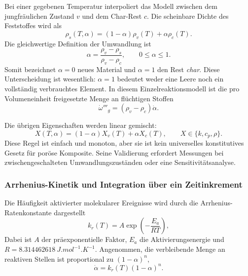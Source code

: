 \documentclass[oneside,openany]{amsdtx}
\begin{document}
Bei einer gegebenen Temperatur interpoliert das Modell zwischen dem jungfräulichen Zustand \(v\) und dem Char-Rest \(c\). Die scheinbare Dichte des Feststoffes wird als
\begin{equation}
  \rho_s(T,\alpha)=(1-\alpha)\rho_v(T)+\alpha\rho_c(T).
  \label{eq:density-mix}
\end{equation}
Die gleichwertige Definition der Umwandlung ist
\begin{equation}
  \alpha=\frac{\rho_v-\rho_s}{\rho_v-\rho_c},\qquad 0\le\alpha\le1.
  \label{eq:alpha-density}
\end{equation}
Somit bezeichnet \(\alpha=0\) neues Material und \(\alpha=1\) den Rest \emph{char}. Diese Unterscheidung ist wesentlich: \(\alpha=1\) bedeutet weder eine Leere noch ein vollständig verbrauchtes Element. In diesem Einzelreaktionsmodell ist die pro Volumeneinheit freigesetzte Menge an flüchtigen Stoffen
\begin{equation}
  \dot\omega'''_g=(\rho_v-\rho_c)\dot\alpha.
  \label{eq:gas-source}
\end{equation}

Die übrigen Eigenschaften werden linear gemischt:
\begin{equation}
  X(T,\alpha)=(1-\alpha)X_v(T)+\alpha X_c(T),
  \qquad X\in\{k,c_p,\rho\}.
  \label{eq:mix-rule}
\end{equation}
Diese Regel ist einfach und monoton, aber sie ist kein universelles konstitutives Gesetz für poröse Komposite. Seine Validierung erfordert Messungen bei zwischengeschalteten Umwandlungszuständen oder eine Sensitivitätsanalyse.

\subsubsection{Arrhenius-Kinetik und Integration über ein Zeitinkrement}

Die Häufigkeit aktivierter molekularer Ereignisse wird durch die Arrhenius-Ratenkonstante dargestellt
\begin{equation}
  k_r(T)=A\exp\left(-\frac{E_a}{R T}\right),
  \label{eq:arrhenius}
\end{equation}
Dabei ist \(A\) der präexponentielle Faktor, \(E_a\) die Aktivierungsenergie und \(R=\SI{8.314462618}{J.mol^{-1}.K^{-1}}\). Angenommen, die verbleibende Menge an reaktiven Stellen ist proportional zu \((1-\alpha)^n\),
\begin{equation}
  \boxed{\dot\alpha=k_r(T)(1-\alpha)^n.}
  \label{eq:kinetic-law}
\end{equation}
\end{document}

